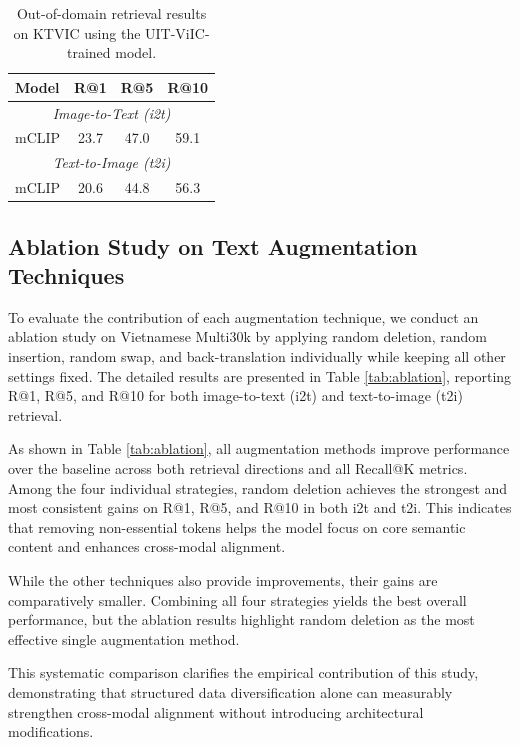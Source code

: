 \begin{table}[ht]
\centering
\caption{Out-of-domain retrieval results on KTVIC using the UIT-ViIC-trained model.}
\label{tab:ktvic}
\begin{tabular}{|l|c|c|c|}
\hline
\textbf{Model} & \textbf{R@1} & \textbf{R@5} & \textbf{R@10} \\
\hline
\multicolumn{4}{|c|}{\textit{Image-to-Text (i2t)}} \\
\hline
mCLIP & 23.7 & 47.0 & 59.1 \\
\hline
\multicolumn{4}{|c|}{\textit{Text-to-Image (t2i)}} \\
\hline
mCLIP & 20.6 & 44.8 & 56.3 \\
\hline
\end{tabular}
\end{table}

\subsection{Ablation Study on Text Augmentation Techniques}

To evaluate the contribution of each augmentation technique, we conduct an ablation study on Vietnamese Multi30k by applying random deletion, random insertion, random swap, and back-translation individually while keeping all other settings fixed. The detailed results are presented in Table \ref{tab:ablation}, reporting R@1, R@5, and R@10 for both image-to-text (i2t) and text-to-image (t2i) retrieval.

As shown in Table \ref{tab:ablation}, all augmentation methods improve performance over the baseline across both retrieval directions and all Recall@K metrics. Among the four individual strategies, random deletion achieves the strongest and most consistent gains on R@1, R@5, and R@10 in both i2t and t2i. This indicates that removing non-essential tokens helps the model focus on core semantic content and enhances cross-modal alignment.

While the other techniques also provide improvements, their gains are comparatively smaller. Combining all four strategies yields the best overall performance, but the ablation results highlight random deletion as the most effective single augmentation method.

This systematic comparison clarifies the empirical contribution of this study, demonstrating that structured data diversification alone can measurably strengthen cross-modal alignment without introducing architectural modifications.



